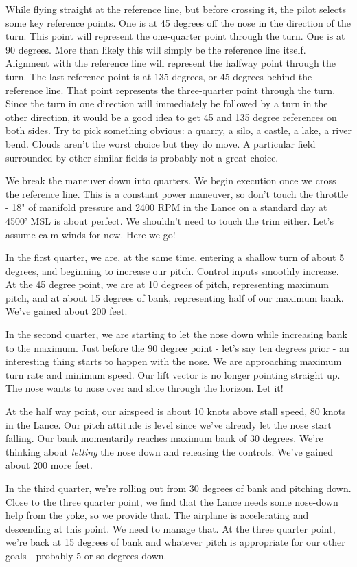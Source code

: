 While flying straight at the reference line, but before crossing it, the pilot selects some key reference points. One is at 45 degrees off the nose in the direction of the turn. This point will represent the one-quarter point through the turn. One is at 90 degrees. More than likely this will simply be the reference line itself. Alignment with the reference line will represent the halfway point through the turn. The last reference point is at 135 degrees, or 45 degrees behind the reference line. That point represents the three-quarter point through the turn. Since the turn in one direction will immediately be followed by a turn in the other direction, it would be a good idea to get 45 and 135 degree references on both sides. Try to pick something obvious: a quarry, a silo, a castle, a lake, a river bend. Clouds aren't the worst choice but they do move. A particular field surrounded by other similar fields is probably not a great choice.

We break the maneuver down into quarters. We begin execution once we cross the reference line. This is a constant power maneuver, so don't touch the throttle - 18" of manifold pressure and 2400 RPM in the Lance on a standard day at 4500' MSL is about perfect. We shouldn't need to touch the trim either. Let's assume calm winds for now. Here we go!

In the first quarter, we are, at the same time, entering a shallow turn of about 5 degrees, and beginning to increase our pitch. Control inputs smoothly increase. At the 45 degree point, we are at 10 degrees of pitch, representing maximum pitch, and at about 15 degrees of bank, representing half of our maximum bank. We've gained about 200 feet.

In the second quarter, we are starting to let the nose down while increasing bank to the maximum. Just before the 90 degree point - let's say ten degrees prior - an interesting thing starts to happen with the nose. We are approaching maximum turn rate and minimum speed. Our lift vector is no longer pointing straight up. The nose wants to nose over and slice through the horizon. Let it!

At the half way point, our airspeed is about 10 knots above stall speed, 80 knots in the Lance. Our pitch attitude is level since we've already let the nose start falling. Our bank momentarily reaches maximum bank of 30 degrees. We're thinking about \emph{letting} the nose down and releasing the controls. We've gained about 200 more feet.

In the third quarter, we're rolling out from 30 degrees of bank and pitching down. Close to the three quarter point, we find that the Lance needs some nose-down help from the yoke, so we provide that. The airplane is accelerating and descending at this point. We need to manage that. At the three quarter point, we're back at 15 degrees of bank and whatever pitch is appropriate for our other goals - probably 5 or so degrees down.

